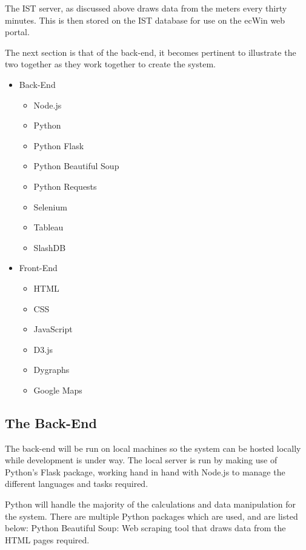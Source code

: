 \documentclass[12pt,onecolumn]{IEEEtran}
\begin{document}
The IST server, as discussed above draws data from the meters every thirty minutes. This is then stored on the IST database for use on the ecWin web portal.

The next section is that of the back-end, it becomes pertinent to illustrate the two together as they work together to create the system. 

\begin{itemize}
    \item Back-End
    \begin{itemize}
        \item Node.js
        \item Python
        \item Python Flask
        \item Python Beautiful Soup
        \item Python Requests
        \item Selenium
        \item Tableau
        \item SlashDB
    \end{itemize}
    \item Front-End
    \begin{itemize}
        \item HTML
        \item CSS
        \item JavaScript
        \item D3.js
        \item Dygraphs
        \item Google Maps
    \end{itemize}
\end{itemize}

\subsection{The Back-End} \label{sec:back-end system architecture}
The back-end will be run on local machines so the system can be hosted locally while development is under way.
The local server is run by making use of Python's Flask package, working hand in hand with Node.js to manage the different languages and tasks required.

Python will handle the majority of the calculations and data manipulation for the system. There are multiple Python packages which are used, and are listed below:
\newline
Python Beautiful Soup: Web scraping tool that draws data from the HTML pages required.
\end{document}
